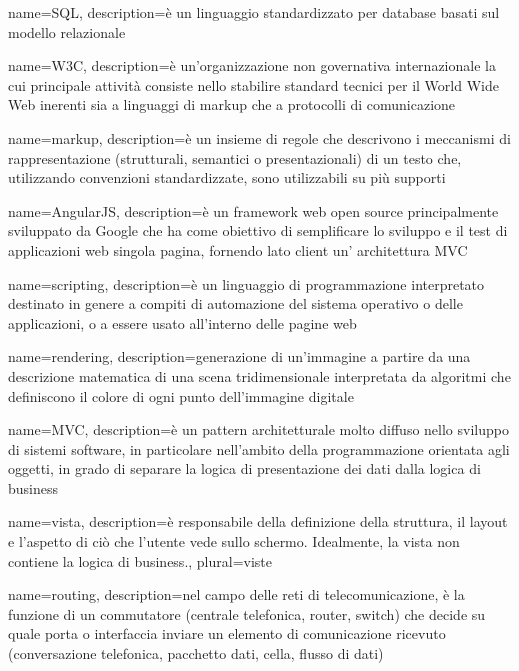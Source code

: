  {
	name=SQL,
	description={è un linguaggio standardizzato per database basati sul modello relazionale }
}

 {
	name=W3C,
	description={è un'organizzazione non governativa internazionale la cui principale attività  consiste nello stabilire standard tecnici per il World Wide Web inerenti sia a linguaggi di markup che a protocolli di comunicazione}
}

 {
	name=markup,
	description={è un insieme di regole che descrivono i meccanismi di rappresentazione (strutturali, semantici o presentazionali) di un testo che, utilizzando convenzioni standardizzate, sono utilizzabili su più supporti}
}

 {
	name=AngularJS,
	description={è un framework web open source principalmente sviluppato da Google che ha come obiettivo di semplificare lo sviluppo e il test di applicazioni web singola pagina, fornendo lato client un' architettura MVC}
}

 {
	name=scripting,
	description={è un linguaggio di programmazione interpretato destinato in genere a compiti di automazione del sistema operativo o delle applicazioni, o a essere usato all'interno delle pagine web}
}

 {
	name=rendering,
	description={generazione di un'immagine a partire da una descrizione matematica di una scena tridimensionale interpretata da algoritmi che definiscono il colore di ogni punto dell'immagine digitale}
}

 {
	name=MVC,
	description={è un pattern architetturale molto diffuso nello sviluppo di sistemi software, in particolare nell'ambito della programmazione orientata agli oggetti, in grado di separare la logica di presentazione dei dati dalla logica di business}
}

 {
	name=vista,
	description={è responsabile della definizione della struttura, il layout e l'aspetto di ciò che l'utente vede sullo schermo. Idealmente, la vista non contiene la logica di business.},
	plural=viste
}

 {
	name=routing,
	description={nel campo delle reti di telecomunicazione, è la funzione di un commutatore (centrale telefonica, router, switch) che decide su quale porta o interfaccia inviare un elemento di comunicazione ricevuto (conversazione telefonica, pacchetto dati, cella, flusso di dati)}
}

